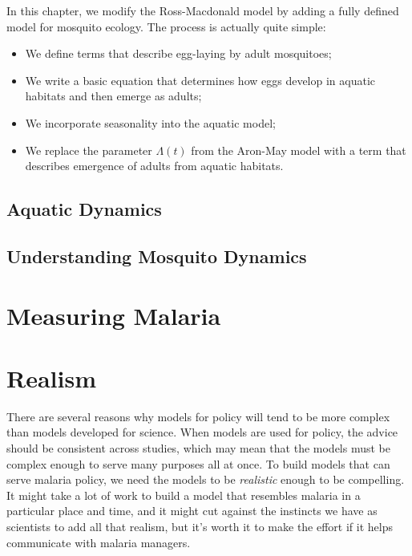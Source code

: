 \documentclass[
]{book}
\begin{document}
In this chapter, we modify the Ross-Macdonald model by adding a
fully defined model for mosquito ecology. The process is actually
quite simple:

\begin{itemize}
\item
  We define terms that describe egg-laying by adult mosquitoes;
\item
  We write a basic equation that determines how eggs develop in
  aquatic habitats and then emerge as adults;
\item
  We incorporate seasonality into the aquatic model;
\item
  We replace the parameter \(\Lambda(t)\) from the Aron-May model with a term that
  describes emergence of adults from aquatic habitats.
\end{itemize}

\hypertarget{aquatic-dynamics}{%
\section{Aquatic Dynamics}\label{aquatic-dynamics}}

\hypertarget{understanding-mosquito-dynamics}{%
\section{Understanding Mosquito Dynamics}\label{understanding-mosquito-dynamics}}

\hypertarget{measuring-malaria}{%
\chapter{Measuring Malaria}\label{measuring-malaria}}

\hypertarget{realism}{%
\chapter{Realism}\label{realism}}

There are several reasons why models for policy will tend to be more complex than models developed for science. When models are used for policy, the advice should be consistent across studies, which may mean that the models must be complex enough to serve many purposes all at once. To build models that can serve malaria policy, we need the models to be \emph{realistic} enough to be compelling. It might take a lot of work to build a model that resembles malaria in a particular place and time, and it might cut against the instincts we have as scientists to add all that realism, but it's worth it to make the effort if it helps communicate with malaria managers.
\end{document}
